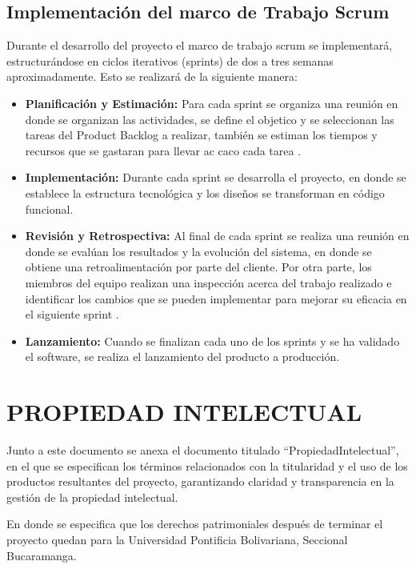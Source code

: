 \documentclass[spanish]{ieee_upb}
\begin{document}
\subsection{Implementación del marco de Trabajo Scrum}
Durante el desarrollo del proyecto el marco de trabajo scrum se implementará, estructurándose en ciclos iterativos (sprints) de dos a tres semanas aproximadamente. Esto se realizará de la siguiente manera:  
\begin{itemize}
    \item \textbf{Planificación y Estimación:} Para cada sprint se organiza una reunión en donde se organizan las actividades, se define el objetico y se seleccionan las tareas del Product Backlog a realizar, también se estiman los tiempos y recursos que se gastaran para llevar ac caco cada tarea \cite{Cohn2005}.
    \item \textbf{Implementación:} Durante cada sprint se desarrolla el proyecto, en donde se establece la estructura tecnológica y los diseños se transforman en código funcional.
    \item \textbf{Revisión y Retrospectiva:} Al final de cada sprint se realiza una reunión en donde se evalúan los resultados y la evolución del sistema, en donde se obtiene una retroalimentación por parte del cliente. Por otra parte, los miembros del equipo realizan una inspección acerca del trabajo realizado e identificar los cambios que se pueden implementar para mejorar su eficacia en el siguiente sprint \cite{schwaber2020guia}.
    \item \textbf{Lanzamiento:} Cuando se finalizan cada uno de los sprints y se ha validado el software, se realiza el lanzamiento del producto a producción. 
\end{itemize}

\newpage
\section{PROPIEDAD INTELECTUAL}
Junto a este documento se anexa el documento titulado “PropiedadIntelectual”, en el que se especifican los términos relacionados con la titularidad y el uso de los productos resultantes del proyecto, garantizando claridad y transparencia en la gestión de la propiedad intelectual. 
\vspace{0.3 cm}

En donde se especifica que los derechos patrimoniales después de terminar el proyecto quedan para la Universidad Pontificia Bolivariana, Seccional Bucaramanga.
\end{document}
